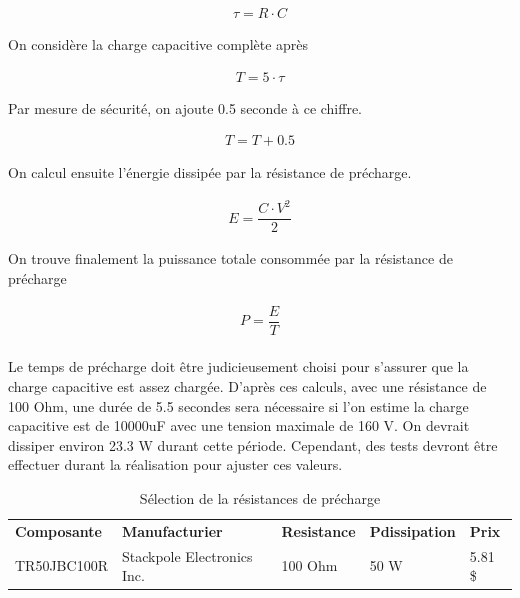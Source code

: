 		\begin{align}
			\tau =R \cdot C
			\label{eq:Constante de temps}
		\end{align}
				
		On considère la charge capacitive complète après	
	 
		\begin{align}
			T = 5 \cdot \tau
			\label{eq:CapaciteCharge}
		\end{align}
		
		Par mesure de sécurité, on ajoute 0.5 seconde à ce chiffre.
		
		\begin{align}
			T = T + 0.5
			\label{eq:Tempsdecharge}
		\end{align}		
				
		On calcul ensuite l'énergie dissipée par la résistance de précharge.
		
		\begin{align}
			E = \dfrac{C \cdot V^2}{2}
			\label{eq:EnergiePrecharge}
		\end{align}
		
		On trouve finalement la puissance totale consommée par la résistance de précharge
	
		\begin{align}
			P = \dfrac{E}{T}
			\label{eq:PuissancePrecharge}
		\end{align}	
			
		\paragraph*{}		
		Le temps de précharge doit être judicieusement choisi pour s'assurer que la charge capacitive est assez chargée. D'après ces calculs, avec une résistance de 100 Ohm, une durée de 5.5 secondes sera nécessaire si l'on estime la charge capacitive est de 10000uF avec une tension maximale de 160 V. On devrait dissiper environ 23.3 W durant cette période. Cependant, des tests devront être effectuer durant la réalisation pour ajuster ces valeurs.
				
		\begin{table}[H]
			\centering
			\caption{Sélection de la résistances de précharge}
			\label{ResistancePrecharge}
			\renewcommand{\arraystretch}{1.3}
			\begin{tabular}{|p{3cm}|p{5cm}|p{2cm}|p{2cm}|p{1.5cm}|}
				\hline
				\textbf{Composante} & \textbf{Manufacturier} & \textbf{Resistance} & \textbf{Pdissipation} & \textbf{Prix}
				\\ \hhline{|=|=|=|=|=|}
				TR50JBC100R & Stackpole Electronics Inc. & 100 Ohm & 50 W & 5.81 \$ \\ \hline		
			\end{tabular}
		\end{table}

